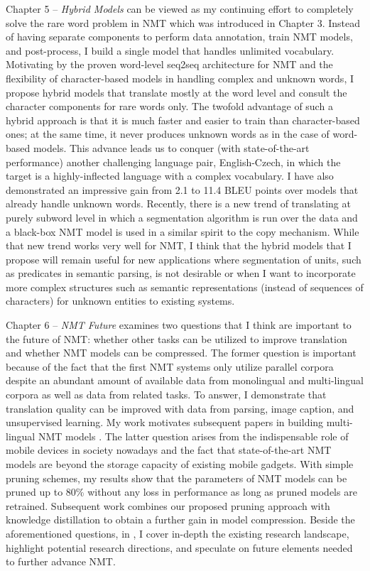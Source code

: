 Chapter 5 -- {\it Hybrid Models} can be viewed as my continuing effort to completely solve the rare word problem in NMT which was introduced in Chapter 3.
Instead of having separate components to perform data annotation, train NMT models, and post-process, I build a single model that handles unlimited vocabulary. Motivating by the proven word-level seq2seq architecture for NMT and the flexibility of character-based models in handling complex and unknown words, I propose hybrid models that translate mostly at the word level and consult the character components for rare words only. The twofold advantage of such a hybrid approach is that it is much faster and easier to train than character-based ones; at the same time, it never produces unknown words as in the case of word-based models. This advance leads us to conquer (with state-of-the-art performance) another challenging language pair, English-Czech, in which the target is a highly-inflected language with a complex vocabulary. I have also demonstrated an impressive gain from 2.1 to 11.4 BLEU points over models that already handle unknown words. Recently, there is a new trend of translating at purely subword level \cite{sennrich16sub,gnmt16} in which a segmentation algorithm is run over the data and a black-box NMT model is used in a similar spirit to the copy mechanism. While that new trend works very well for NMT, I think that the hybrid models that I propose will remain useful for new applications where segmentation of units, such as predicates in semantic parsing, is not desirable or when I want to incorporate more complex structures such as semantic representations (instead of sequences of characters) for unknown entities to existing systems.

Chapter 6 -- {\it NMT Future} examines two questions that I think are important to the future of NMT: whether other tasks can be utilized to improve translation and whether NMT models can be compressed. The former question is important because of the fact that the first NMT systems only utilize parallel corpora despite an abundant amount of available data from monolingual and multi-lingual corpora as well as data from related tasks. To answer, 
I demonstrate that translation quality can be improved with data from parsing, image caption, and unsupervised learning. My work motivates subsequent papers in building multi-lingual NMT models \cite{zoph16,firat16,gnmt16multi,ha16}.
 The latter question arises from the indispensable role of mobile devices in society nowadays and the fact that state-of-the-art NMT models are beyond the storage capacity of existing mobile gadgets. With simple pruning schemes, my results show that the parameters of NMT models can be pruned up to 80\% without any loss in performance as long as pruned models are retrained. Subsequent work \cite{kim16distill} combines our proposed pruning approach with knowledge distillation to obtain a further gain in model compression. Beside the aforementioned questions, in , I cover in-depth the existing research landscape, highlight potential research directions, and speculate on future elements needed to further advance NMT.

